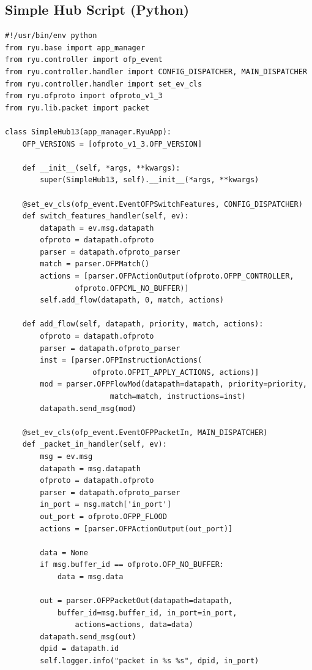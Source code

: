 \documentclass[a4,12pt]{scrartcl}
\begin{document}
\subsection{Simple Hub Script (Python)}
\begin{lstlisting}
#!/usr/bin/env python
from ryu.base import app_manager
from ryu.controller import ofp_event
from ryu.controller.handler import CONFIG_DISPATCHER, MAIN_DISPATCHER
from ryu.controller.handler import set_ev_cls
from ryu.ofproto import ofproto_v1_3
from ryu.lib.packet import packet

class SimpleHub13(app_manager.RyuApp):
    OFP_VERSIONS = [ofproto_v1_3.OFP_VERSION]

    def __init__(self, *args, **kwargs):
        super(SimpleHub13, self).__init__(*args, **kwargs)

    @set_ev_cls(ofp_event.EventOFPSwitchFeatures, CONFIG_DISPATCHER)
    def switch_features_handler(self, ev):
        datapath = ev.msg.datapath
        ofproto = datapath.ofproto
        parser = datapath.ofproto_parser
        match = parser.OFPMatch()
        actions = [parser.OFPActionOutput(ofproto.OFPP_CONTROLLER, 
        		ofproto.OFPCML_NO_BUFFER)]
        self.add_flow(datapath, 0, match, actions)

    def add_flow(self, datapath, priority, match, actions):
        ofproto = datapath.ofproto
        parser = datapath.ofproto_parser
        inst = [parser.OFPInstructionActions(
        			ofproto.OFPIT_APPLY_ACTIONS, actions)]
        mod = parser.OFPFlowMod(datapath=datapath, priority=priority, 
        				match=match, instructions=inst)
        datapath.send_msg(mod)

    @set_ev_cls(ofp_event.EventOFPPacketIn, MAIN_DISPATCHER)
    def _packet_in_handler(self, ev):
        msg = ev.msg
        datapath = msg.datapath
        ofproto = datapath.ofproto
        parser = datapath.ofproto_parser
        in_port = msg.match['in_port']
        out_port = ofproto.OFPP_FLOOD
        actions = [parser.OFPActionOutput(out_port)]

        data = None
        if msg.buffer_id == ofproto.OFP_NO_BUFFER:
            data = msg.data

        out = parser.OFPPacketOut(datapath=datapath, 
        	buffer_id=msg.buffer_id, in_port=in_port, 
        		actions=actions, data=data)
        datapath.send_msg(out)
        dpid = datapath.id
        self.logger.info("packet in %s %s", dpid, in_port)
\end{lstlisting}
\end{document}

